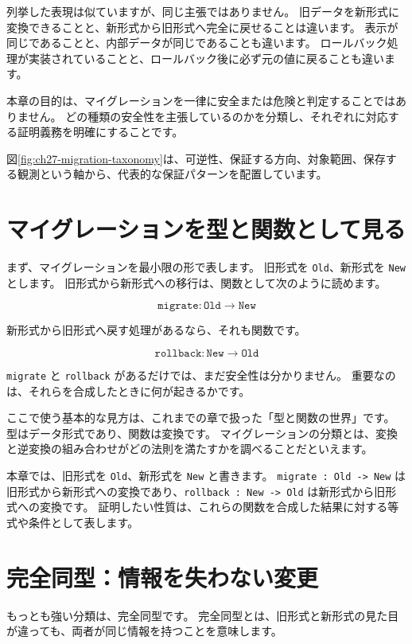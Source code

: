 列挙した表現は似ていますが、同じ主張ではありません。
旧データを新形式に変換できることと、新形式から旧形式へ完全に戻せることは違います。
表示が同じであることと、内部データが同じであることも違います。
ロールバック処理が実装されていることと、ロールバック後に必ず元の値に戻ることも違います。

本章の目的は、マイグレーションを一律に安全または危険と判定することではありません。
どの種類の安全性を主張しているのかを分類し、それぞれに対応する証明義務を明確にすることです。

図\ref{fig:ch27-migration-taxonomy}は、可逆性、保証する方向、対象範囲、保存する観測という軸から、代表的な保証パターンを配置しています。


\section{マイグレーションを型と関数として見る}

まず、マイグレーションを最小限の形で表します。
旧形式を \texttt{Old}、新形式を \texttt{New} とします。
旧形式から新形式への移行は、関数として次のように読めます。

\[
\texttt{migrate} : \texttt{Old} \to \texttt{New}
\]

新形式から旧形式へ戻す処理があるなら、それも関数です。

\[
\texttt{rollback} : \texttt{New} \to \texttt{Old}
\]

\texttt{migrate} と \texttt{rollback} があるだけでは、まだ安全性は分かりません。
重要なのは、それらを合成したときに何が起きるかです。

ここで使う基本的な見方は、これまでの章で扱った「型と関数の世界」です。
型はデータ形式であり、関数は変換です。
マイグレーションの分類とは、変換と逆変換の組み合わせがどの法則を満たすかを調べることだといえます。

本章では、旧形式を \texttt{Old}、新形式を \texttt{New} と書きます。
\texttt{migrate : Old -> New} は旧形式から新形式への変換であり、\texttt{rollback : New -> Old} は新形式から旧形式への変換です。
証明したい性質は、これらの関数を合成した結果に対する等式や条件として表します。

\section{完全同型：情報を失わない変更}

もっとも強い分類は、完全同型です。
完全同型とは、旧形式と新形式の見た目が違っても、両者が同じ情報を持つことを意味します。


